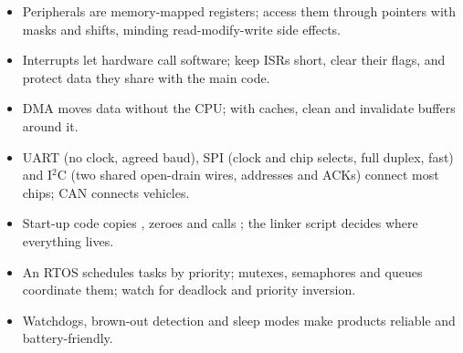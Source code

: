 \begin{itemize}
  \item Peripherals are memory-mapped registers; access them through  pointers with masks and shifts, minding read-modify-write side effects.
  \item Interrupts let hardware call software; keep ISRs short, clear their flags, and protect data they share with the main code.
  \item DMA moves data without the CPU; with caches, clean and invalidate buffers around it.
  \item UART (no clock, agreed baud), SPI (clock and chip selects, full duplex, fast) and I$^2$C (two shared open-drain wires, addresses and ACKs) connect most chips; CAN connects vehicles.
  \item Start-up code copies , zeroes  and calls ; the linker script decides where everything lives.
  \item An RTOS schedules tasks by priority; mutexes, semaphores and queues coordinate them; watch for deadlock and priority inversion.
  \item Watchdogs, brown-out detection and sleep modes make products reliable and battery-friendly.
\end{itemize}
